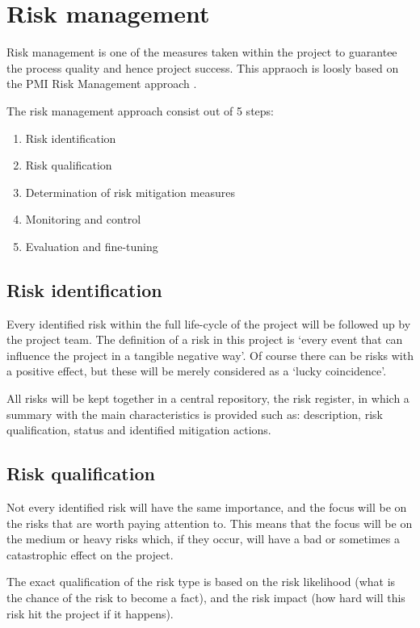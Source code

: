 \section{Risk management}
\label{sec:risk-management}
Risk management is one of the measures taken within the project to guarantee the process quality and hence project success.
This appraoch is loosly based on the PMI Risk Management approach  \cite{pmi}.

The risk management approach consist out of 5 steps:

\begin{enumerate}
	\item Risk identification 
	\item Risk qualification
	\item Determination of risk mitigation measures
	\item Monitoring and control
	\item Evaluation and fine-tuning
\end {enumerate}
\subsection{Risk identification}
Every identified risk within the full life-cycle of the project will be followed up by the project team.
The definition of a risk in this project is  `every event that can influence the project in a tangible negative way'.
Of course there can be risks with a positive effect, but these will be merely considered as a `lucky coincidence'.

All risks will be kept together in a central repository, the risk register, in which a summary with the main characteristics is provided such as: description, risk qualification, status and identified mitigation actions.

\subsection{Risk qualification}
Not every identified risk will have the same importance, and the focus will be on the risks that are worth paying attention to.
This means that the focus will be on the medium or heavy risks which, if they occur, will have a bad or sometimes a catastrophic effect on the project.

The exact qualification of the risk type is based on the risk likelihood (what is the chance of the risk to become a fact), and the risk impact (how hard will this risk hit the project if it happens).


